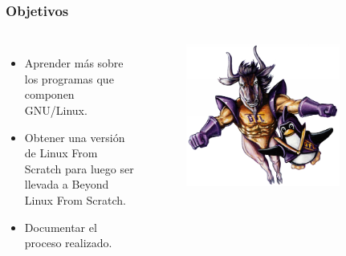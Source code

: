 \documentclass{beamer}
\begin{document}
\begin{frame}
  \frametitle{Objetivos}
  \begin{columns}
    \begin{itemize}
      \item Aprender más sobre los programas que componen GNU/Linux.
      \item Obtener una versión de Linux From Scratch para luego ser llevada a Beyond Linux From Scratch.
      \item Documentar el proceso realizado.
    \end{itemize}

    \begin{figure}
      \centering
      \includegraphics[width=0.8\textwidth]{img/gnu-tux.jpg}
    \end{figure}
  \end{columns}

\end{frame}
\end{document}
